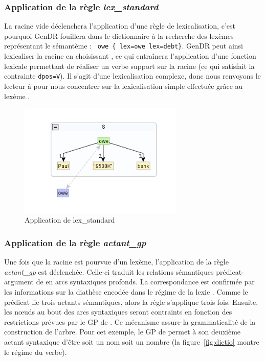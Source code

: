 \subsubsection{Application de la règle \emph{lex\_standard}}
La racine vide déclenchera l'application d'une règle de lexicalisation, c'est pourquoi GenDR fouillera dans le dictionnaire à la recherche des lexèmes représentant le sémantème : \lstinline! owe { lex=owe lex=debt}!. GenDR peut ainsi lexicaliser la racine en choisissant , ce qui entraînera l'application d'une fonction lexicale permettant de réaliser un verbe support sur la racine (ce qui satisfait la contrainte \texttt{dpos=V}). Il s'agit d'une lexicalisation complexe, donc nous renvoyons le lecteur à \cite{lambrey15,LambreyImplementationcollocationspour2017,lareau18} pour nous concentrer sur la lexicalisation simple effectuée grâce au lexème .

\begin{figure}[htb]
	\centering
	\includegraphics[width=0.7\textwidth, trim = {0cm 0.7cm 0cm 0.9cm},clip]{ch3/figs/lex_standard_root.png}
		\vspace{-0.5cm}
	\caption{Application de lex\_standard}
	\label{fig:lexstand1}
\end{figure}

\subsubsection{Application de la règle \emph{actant\_gp}}\label{sec:r-actantgp}
Une fois que la racine est pourvue d'un lexème, l'application de la règle \emph{actant\_gp} est déclenchée. Celle-ci traduit les relations sémantiques prédicat-argument de  en arcs syntaxiques profonds. La correspondance est confirmée par les informations sur la diathèse encodée dans le régime de la lexie . Comme le prédicat lie trois actants sémantiques, alors la règle s'applique trois fois. Ensuite, les n\oe{}uds au bout des arcs syntaxiques seront contraints en fonction des restrictions prévues par le \ac{GP} de . Ce mécanisme assure la grammaticalité de la construction de l'arbre. Pour cet exemple, le \ac{GP} de  permet à son deuxième actant syntaxique d'être soit un nom soit un nombre (la figure~\ref{fig:dictio} montre le régime du verbe).

